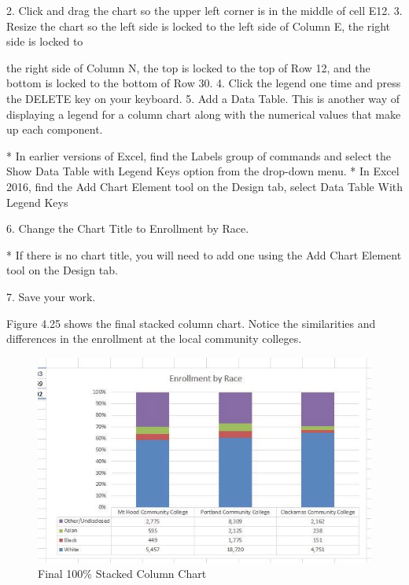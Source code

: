 2. Click and drag the chart so the upper left corner is in the middle of cell E12.
3. Resize the chart so the left side is locked to the left side of Column E, the right side is locked to



the right side of Column N, the top is locked to the top of Row 12, and the bottom is locked to
the bottom of Row 30.
4. Click the legend one time and press the DELETE key on your keyboard.
5. Add a Data Table. This is another way of displaying a legend for a column chart along with the
numerical values that make up each component.

* In earlier versions of Excel, find the Labels group of commands and select the Show Data
Table with Legend Keys option from the drop-down menu.
* In Excel 2016, find the Add Chart Element tool on the Design tab, select Data Table With
Legend Keys

6. Change the Chart Title to Enrollment by Race.

* If there is no chart title, you will need to add one using the Add Chart Element tool on
the Design tab.

7. Save your work.

Figure 4.25 shows the final stacked column chart. Notice the similarities and differences in the
enrollment at the local community colleges.


\begin{figure}[H]
	\centering
	\includegraphics[width=\maxwidth{.95\linewidth}]{gfx/ch04_fig26}
	\caption{Final 100\% Stacked Column Chart}
	\label{04:fig26}
\end{figure}

